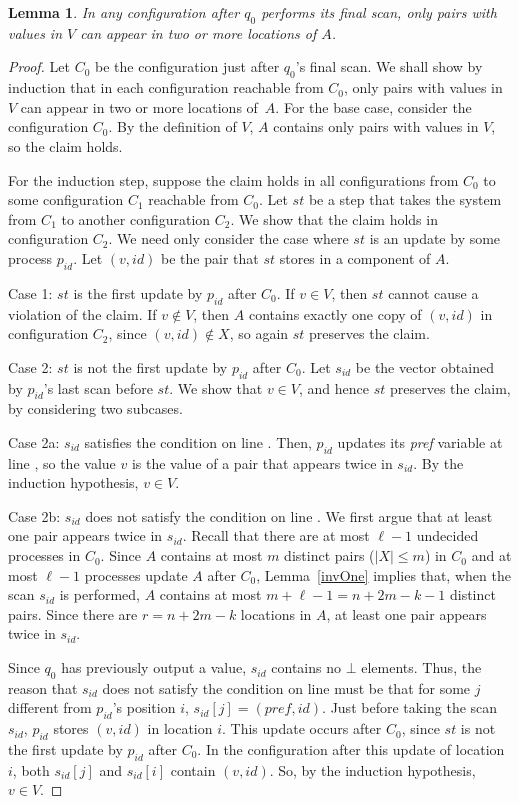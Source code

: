 \documentclass[11pt]{article}
\newtheorem{lemma}[theorem]{Lemma}
\newcounter{linenum}
\newcounter{ind}
\newcommand{\lref}[1]{\linenumref{#1}}
\begin{document}
\begin{lemma}\label{lem:safety}
In any configuration after $q_0$ performs its final scan, 
only pairs with values in $V$ can appear in two or more locations of $A$.
\end{lemma}
\begin{proof}
Let $C_0$ be the configuration just after $q_0$'s final scan.
We shall show by induction that in each configuration
reachable from $C_0$, 
only pairs with values in $V$ can appear in two or more locations of~$A$.
For the base case, consider the configuration $C_0$.
By the definition of $V$, $A$ contains only pairs with values in $V$,  
so the claim holds.

For the induction step, suppose the claim holds in all configurations 
from $C_0$ to some configuration $C_1$ reachable from $C_0$.
Let $st$ be a step that takes the system from $C_1$ to another configuration $C_2$.
We show that the claim holds in configuration $C_2$.
We need only consider the case where $st$ is an update by some process 
$p_{id}$.  Let $(v,id)$ be the pair that $st$ stores in a component of $A$.


{\sc Case 1}: $st$ is the first update by $p_{id}$ after $C_0$. 
If $v\in V$, then $st$ cannot cause a violation of the claim.
If $v\notin V$, then $A$ contains exactly one copy of $(v,id)$ in configuration
$C_2$, since $(v,id)\notin X$, so again $st$ preserves the claim.

{\sc Case 2}: $st$ is not the first update by $p_{id}$ after $C_0$.
Let $s_{id}$ be the vector obtained by $p_{id}$'s
last scan before $st$.
We show that $v\in V$, and hence $st$ preserves the claim, by considering two subcases.

{\sc Case 2a}:  $s_{id}$ satisfies the condition on line \lref{cond}. 
Then, $p_{id}$ updates its {\it pref} variable at line \lref{change-pref},
so the value $v$ is the value
of a pair that appears twice in $s_{id}$.
By the induction hypothesis, $v\in V$.

{\sc Case 2b}: $s_{id}$ does not satisfy the condition on line \lref{cond}.
We first argue that at least one pair appears twice in $s_{id}$.
Recall that there are at most $\ell-1$ undecided processes in $C_0$.
Since $A$ contains at most $m$ distinct pairs ($|X|\leq m$) in $C_0$
and at most $\ell-1$ processes update $A$ after $C_0$,
Lemma~\ref{invOne} implies that, 
when the scan $s_{id}$ is performed, $A$ contains at most
$m+\ell-1=n+2m-k-1$ distinct pairs. Since there are $r=n+2m-k$ 
locations in $A$, at least one pair appears twice in $s_{id}$. 

Since $q_0$ has previously output a value, $s_{id}$ contains no $\bot$ elements. 
Thus, the reason that $s_{id}$ does not satisfy the condition on line \lref{cond}
must be that for some $j$ different from $p_{id}$'s position $i$,
$s_{id}[j]=(\textit{pref},id)$.  Just before taking the scan $s_{id}$, $p_{id}$ stores
$(v,id)$ in location $i$. This update occurs after $C_0$, since $st$ is 
not the first update by $p_{id}$ after $C_0$.  
In the configuration after this update of location $i$,
both $s_{id}[j]$ and $s_{id}[i]$ contain $(v,id)$.
So, by the induction hypothesis, $v\in V$.
\end{proof}
\end{document}
